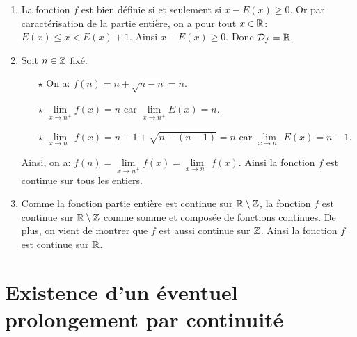 \documentclass[a4paper, 11pt,reqno]{article}
\begin{document}
\begin{correction}
\begin{enumerate}
\item La fonction $f$ est bien d\'efinie si et seulement si $x-E(x)\geq 0$. Or par caract\'erisation de la partie enti\`{e}re, on a pour tout $x\in\mathbb{R}$: $E(x)\leq x<E(x)+1$. Ainsi $x-E(x)\geq 0$. Donc $\mathcal{D}_f=\mathbb{R}$.  
\item Soit $n\in\mathbb{Z}$ fix\'e.
\begin{itemize}
\item[$\star$] On a: $f(n)=n+\sqrt{ n-n}=n$.
\item[$\star$] $\lim\limits_{x\to n^+} f(x)=n$ car $\lim\limits_{x\to n^+} E(x)=n$.
\item[$\star$] $\lim\limits_{x\to n^-} f(x)=n-1+\sqrt{n-(n-1)}=n$ car $\lim\limits_{x\to n^-} E(x)=n-1$.
\end{itemize}
Ainsi, on a: $f(n)=\lim\limits_{x\to n^+} f(x)=\lim\limits_{x\to n^-} f(x)$. Ainsi la fonction $f$ est continue sur tous les entiers.
\item Comme la fonction partie enti\`{e}re est continue sur $\mathbb{R}\setminus\mathbb{Z}$, la fonction $f$ est continue sur $\mathbb{R}\setminus\mathbb{Z}$ comme somme et compos\'ee de fonctions continues. De plus, on vient de montrer que $f$ est aussi continue sur $\mathbb{Z}$. Ainsi la fonction $f$ est continue sur $\mathbb{R}$.
\end{enumerate}
\end{correction}


% 
\vspace*{0.5cm}

\noindent\section{\large{Existence d'un \'eventuel prolongement par continuit\'e}}
\end{document}
